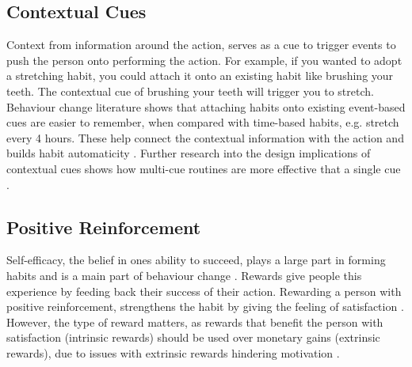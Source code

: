 \subsection*{Contextual Cues}
Context from information around the action, serves as a cue to trigger events to push the person onto performing the action. For example, if you wanted to adopt a stretching habit, you could attach it onto an existing habit like brushing your teeth. The contextual cue of brushing your teeth will trigger you to stretch. Behaviour change literature \cite{article_implementation_intentions_multicue} shows that attaching habits onto existing event-based cues are easier to remember, when compared with time-based habits, e.g. stretch every 4 hours. These help connect the contextual information with the action and builds habit automaticity \cite{article_implementation_intentions}. Further research into the design implications of contextual cues shows how multi-cue routines are more effective that a single cue \cite{article_understanding_use_contextual_cues_design_impl}.

\subsection*{Positive Reinforcement}
Self-efficacy, the belief in ones ability to succeed, plays a large part in forming habits and is a main part of behaviour change \cite{article_a_self_efficacy}. Rewards give people this experience by feeding back their success of their action. Rewarding a person with positive reinforcement, strengthens the habit by giving the feeling of satisfaction \cite{article_promoting_habit_formation}. However, the type of reward matters, as rewards that benefit the person with satisfaction (intrinsic rewards) should be used over monetary gains (extrinsic rewards), due to issues with extrinsic rewards hindering motivation \cite{article_meta_analytic_review_intrinsic_motivation}.

